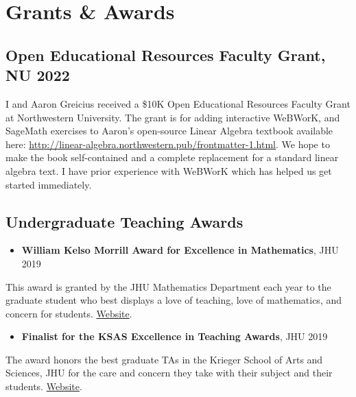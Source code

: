 \documentclass[
]{report}
\providecommand{\tightlist}{%
  \setlength{\itemsep}{0pt}\setlength{\parskip}{0pt}}
\begin{document}
\hypertarget{grants-awards}{%
\chapter{Grants \& Awards}\label{grants-awards}}

\hypertarget{open-educational-resources-faculty-grant-nu-2022}{%
\section{Open Educational Resources Faculty Grant, NU 2022}\label{open-educational-resources-faculty-grant-nu-2022}}

I and Aaron Greicius received a \$10K Open Educational Resources Faculty Grant at Northwestern University.
The grant is for adding interactive WeBWorK, and SageMath exercises to Aaron's open-source Linear Algebra textbook available here: \url{http://linear-algebra.northwestern.pub/frontmatter-1.html}.
We hope to make the book self-contained and a complete replacement for a standard linear algebra text.
I have prior experience with WeBWorK which has helped us get started immediately.

\hypertarget{undergraduate-teaching-awards}{%
\section{Undergraduate Teaching Awards}\label{undergraduate-teaching-awards}}

\begin{itemize}
\tightlist
\item
  \textbf{William Kelso Morrill Award for Excellence in Mathematics}, JHU 2019
\end{itemize}

This award is granted by the JHU Mathematics Department each year to the graduate student who best displays a love of teaching, love of mathematics, and concern for students.
\href{https://sites.krieger.jhu.edu/math-intranet/for-graduate-students/graduate-awards/}{Website}.

\begin{itemize}
\tightlist
\item
  \textbf{Finalist for the KSAS Excellence in Teaching Awards}, JHU 2019
\end{itemize}

The award honors the best graduate TAs in the Krieger School of Arts and Sciences, JHU for the care and concern they take with their subject and their students.
\href{https://krieger.jhu.edu/teaching-award/}{Website}.
\end{document}

